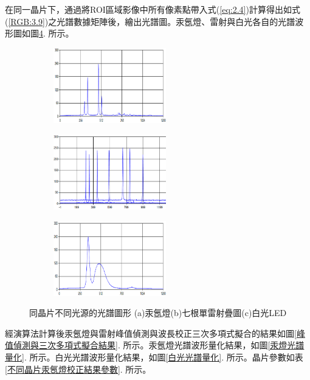 在同一晶片下，通過將ROI區域影像中所有像素點帶入式(\ref{eq:2.4})計算得出如式(\ref{RGB:3.9})之光譜數據矩陣後，繪出光譜圖。汞氬燈、雷射與白光各自的光譜波形圖如圖\ref{fig:Spectrum 1}. 所示。
\begin{figure}[H]
	\vspace{0.8cm}
	\centering
	\begin{subfigure}[fig nice]{0.328\textwidth}
		\includegraphics[width=4.9cm]{figures/Result/20C4-205-C4_HgAr.PNG}
		\caption{}
		\label{fig:Spectrum_HG1}
	\end{subfigure}
	\begin{subfigure}[fig nice]{0.328\textwidth}
		\includegraphics[width=4.9cm]{figures/Result/20C4-205-C4_Laser.PNG}
		\caption{}
		\label{fig:Spectrum_LASER1}
	\end{subfigure}
	\begin{subfigure}[fig nice]{0.328\textwidth}
		\includegraphics[width=4.9cm]{figures/Result/20C4-205-C4_White.PNG}
		\caption{}
		\label{fig:Spectrum_White1}
	\end{subfigure}
	\caption[同一晶片下不同光源的光譜圖形]{同晶片不同光源的光譜圖形 (a)汞氬燈(b)七根單雷射疊圖(c)白光LED}
	\label{fig:Spectrum 1}
\end{figure} 
\newpage
經演算法計算後汞氬燈與雷射峰值偵測與波長校正三次多項式擬合的結果如圖\ref{峰值偵測與三次多項式擬合結果}. 所示。汞氬燈光譜波形量化結果，如圖\ref{汞燈光譜量化}. 所示。白光光譜波形量化結果，如圖\ref{白光光譜量化}. 所示。晶片參數如表\ref{不同晶片汞氬燈校正結果參數}. 所示。
